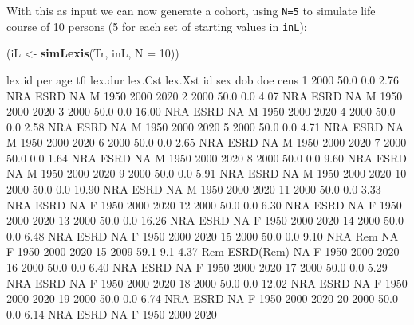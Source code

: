 \documentclass[
]{book}
\newenvironment{Shaded}{\begin{snugshade}}{\end{snugshade}}
\newcommand{\AttributeTok}[1]{\textcolor[rgb]{0.13,0.29,0.53}{#1}}
\newcommand{\DecValTok}[1]{\textcolor[rgb]{0.00,0.00,0.81}{#1}}
\newcommand{\FunctionTok}[1]{\textcolor[rgb]{0.13,0.29,0.53}{\textbf{#1}}}
\newcommand{\NormalTok}[1]{#1}
\newcommand{\OtherTok}[1]{\textcolor[rgb]{0.56,0.35,0.01}{#1}}
\begin{document}
\begin{enumerate}
  With this as input we can now generate a cohort, using \texttt{N=5}
  to simulate life course of 10 persons (5 for each set of starting values
  in \texttt{inL}):

\begin{Shaded}
\begin{Highlighting}[]
\NormalTok{(iL }\OtherTok{\textless{}{-}} \FunctionTok{simLexis}\NormalTok{(Tr, inL, }\AttributeTok{N =} \DecValTok{10}\NormalTok{))}
\end{Highlighting}
\end{Shaded}

\begin{Shaded}
\begin{Highlighting}[]
\NormalTok{ lex.id  per  age tfi lex.dur lex.Cst   lex.Xst id sex  dob  doe cens}
\NormalTok{      1 2000 50.0 0.0    2.76     NRA      ESRD NA   M 1950 2000 2020}
\NormalTok{      2 2000 50.0 0.0    4.07     NRA      ESRD NA   M 1950 2000 2020}
\NormalTok{      3 2000 50.0 0.0   16.00     NRA      ESRD NA   M 1950 2000 2020}
\NormalTok{      4 2000 50.0 0.0    2.58     NRA      ESRD NA   M 1950 2000 2020}
\NormalTok{      5 2000 50.0 0.0    4.71     NRA      ESRD NA   M 1950 2000 2020}
\NormalTok{      6 2000 50.0 0.0    2.65     NRA      ESRD NA   M 1950 2000 2020}
\NormalTok{      7 2000 50.0 0.0    1.64     NRA      ESRD NA   M 1950 2000 2020}
\NormalTok{      8 2000 50.0 0.0    9.60     NRA      ESRD NA   M 1950 2000 2020}
\NormalTok{      9 2000 50.0 0.0    5.91     NRA      ESRD NA   M 1950 2000 2020}
\NormalTok{     10 2000 50.0 0.0   10.90     NRA      ESRD NA   M 1950 2000 2020}
\NormalTok{     11 2000 50.0 0.0    3.33     NRA      ESRD NA   F 1950 2000 2020}
\NormalTok{     12 2000 50.0 0.0    6.30     NRA      ESRD NA   F 1950 2000 2020}
\NormalTok{     13 2000 50.0 0.0   16.26     NRA      ESRD NA   F 1950 2000 2020}
\NormalTok{     14 2000 50.0 0.0    6.48     NRA      ESRD NA   F 1950 2000 2020}
\NormalTok{     15 2000 50.0 0.0    9.10     NRA       Rem NA   F 1950 2000 2020}
\NormalTok{     15 2009 59.1 9.1    4.37     Rem ESRD(Rem) NA   F 1950 2000 2020}
\NormalTok{     16 2000 50.0 0.0    6.40     NRA      ESRD NA   F 1950 2000 2020}
\NormalTok{     17 2000 50.0 0.0    5.29     NRA      ESRD NA   F 1950 2000 2020}
\NormalTok{     18 2000 50.0 0.0   12.02     NRA      ESRD NA   F 1950 2000 2020}
\NormalTok{     19 2000 50.0 0.0    6.74     NRA      ESRD NA   F 1950 2000 2020}
\NormalTok{     20 2000 50.0 0.0    6.14     NRA      ESRD NA   F 1950 2000 2020}
\end{Highlighting}
\end{Shaded}


\end{enumerate}
\end{document}
